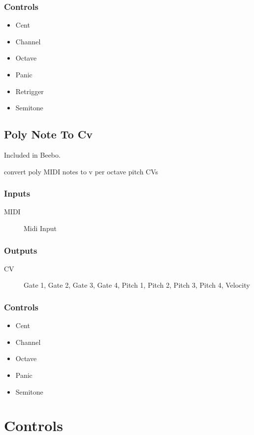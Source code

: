 \subsubsection{Controls}
\begin{itemize}
\item Cent
\item Channel
\item Octave
\item Panic
\item Retrigger
\item Semitone
\end{itemize}

\subsection{Poly Note To Cv}

Included in Beebo.

convert poly MIDI notes to v per octave pitch CVs



\subsubsection{Inputs}
\begin{description}
\item [MIDI] Midi Input
\end{description}

\subsubsection{Outputs}
\begin{description}
\item [CV] Gate 1, Gate 2, Gate 3, Gate 4, Pitch 1, Pitch 2, Pitch 3, Pitch 4, Velocity
\end{description}

\subsubsection{Controls}
\begin{itemize}
\item Cent
\item Channel
\item Octave
\item Panic
\item Semitone
\end{itemize}

\section{Controls}

